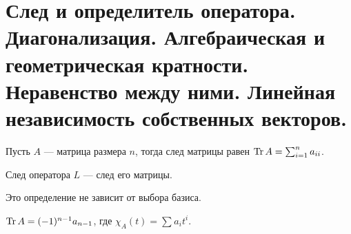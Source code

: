 \section{След и определитель оператора. Диагонализация. Алгебраическая и геометрическая кратности. Неравенство между ними. Линейная независимость собственных векторов.}

\begin{defn}[След]
    Пусть $ A$ --- матрица размера  $ n$, тогда  {\sf след матрицы}  равен $ \operatorname{Tr} A = \sum_{i=1}^{n} a_{ii}$. 

    {\sf След оператора}  $ L $ --- след его матрицы. 
   \begin{note}
       Это определение не зависит от выбора базиса.
   \end{note}
   \begin{note}
       $ \operatorname{Tr} A = (-1)^{n-1}a_{n-1}$, где $ \chi_A(t) = \sum_{}^{} a_i t ^{i}$.
   \end{note}
\end{defn}

